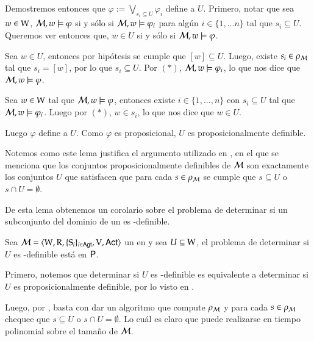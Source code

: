 \begin{demostracion}
    Demostremos entonces que $\varphi := \bigvee\limits_{s_i \subseteq U}\varphi_i$ define a $U$. Primero, notar que sea $w \in \mathrm{W}$, 
    $\mathcal{M}, w \models \varphi$ si y sólo si $\mathcal{M}, w \models \varphi_i$ para algún $i \in \{1,...n\}$ tal que $s_i \subseteq U$.  
    Queremos ver entonces que, $w \in U$ si y sólo si $\mathcal{M}, w \models \varphi$. 

    Sea $w \in U$, entonces por hipótesis se cumple que $[w] \subseteq U$. Luego, existe $s_i \in \rho_{\mathcal{M}}$ tal que 
    $s_i = [w]$, por lo que $s_i \subseteq U$. Por $(*)$, $\mathcal{M}, w \models \varphi_i$, lo que nos dice que $\mathcal{M}, w \models \varphi$.

    Sea $w \in \mathrm{W}$ tal que $\mathcal{M}, w \models \varphi$, entonces existe $i \in \{1,...,n\}$ con $s_i \subseteq U$ tal que $\mathcal{M}, w \models \varphi_i$. 
    Luego por $(*)$, $w \in s_i$, lo que nos dice que $w \in U$.

    Luego $\varphi$ define a $U$. Como $\varphi$ es proposicional, $U$ es proposicionalmente definible.
\end{demostracion}

Notemos como este lema justifica el argumento utilizado en , en el que se menciona que los conjuntos proposicionalmente 
definibles de $\mathcal{M}$ son exactamente los conjuntos $U$ que satisfacen que para cada $s \in \rho_{\mathcal{M}}$ se cumple que 
$s \subseteq U$ o $s \cap U = \emptyset$.

De esta lema obtenemos un corolario sobre el problema de determinar si un subconjunto del dominio de un \ults es \KHilogic-definible.

\begin{corolario}
    Sea $\mathcal{M}=\langle \mathrm{W},\mathrm{R},\{ \mathrm{S}_i \}_{i \in {\rm \sf Agt}},\mathrm{V},{\rm \sf Act} \rangle$ un \ults en \MFD y sea $U \subseteq \mathrm{W}$, el problema de determinar si $U$ es 
    \KHilogic-definible está en $\rm\textsf{P}$.
\end{corolario}

\begin{demostracion}

    Primero, notemos que determinar si $U$ es \KHilogic-definible es equivalente a determinar si $U$ es proposicionalmente definible, por lo visto en 
    .

    Luego, por , basta con dar un algoritmo que compute $\rho_{\mathcal{M}}$ y para cada $s \in \rho_{\mathcal{M}}$ 
    chequee que $s \subseteq U$ o $s \cap U = \emptyset$. Lo cuál es claro que puede realizarse en tiempo polinomial sobre el tamaño de $\mathcal{M}$.
\end{demostracion}

